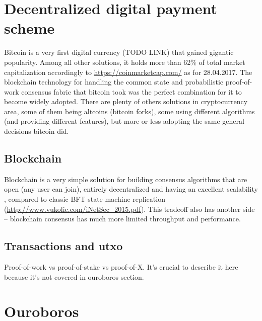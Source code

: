 \documentclass[]{itmo-student-thesis}
\begin{document}
\section{Decentralized digital payment scheme}

Bitcoin is a very first digital currency (TODO LINK) that gained
gigantic popularity. Among all other solutions, it holds more than
62\% of total market capitalization accordingly to
\url{https://coinmarketcap.com/} as for 28.04.2017. The blockchain
technology for handling the common state and probabilistic
proof-of-work consensus fabric that bitcoin took was the perfect
combination for it to become widely adopted. There are plenty of
others solutions in cryptocurrency area, some of them being altcoins
(bitcoin forks), some using different algorithms (and providing
different features), but more or less adopting the same general
decisions bitcoin did.

\subsection{Blockchain}

Blockchain is a very simple solution for building consensus algorithms
that are open (any user can join), entirely decentralized and having
an excellent scalability , compared to classic BFT state machine
replication (\url{http://www.vukolic.com/iNetSec_2015.pdf}). This tradeoff
also has another side -- blockchain consensus has much more limited
throughput and performance.

\subsection{Transactions and utxo}

Proof-of-work vs proof-of-stake vs proof-of-X.  It’s crucial to
describe it here because it’s not covered in ouroboros section.

\section{Ouroboros}
\end{document}
